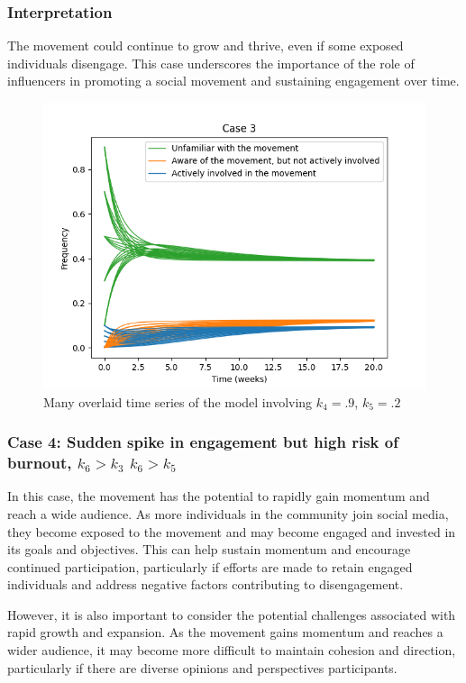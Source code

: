 \documentclass{article}
\begin{document}
    \subsubsection*{Interpretation}The movement could continue to grow and thrive, even if some exposed individuals disengage. This case underscores the importance of the role of influencers in promoting a social movement and sustaining engagement over time. 

    \begin{figure}[H]

        \centering
        \includegraphics[width=\textwidth]{simulation/plots/case3.png}   
        \caption{Many overlaid time series of the model involving \mbox{$k_4=.9$}, \mbox{$k_5=.2$}}
        \label{fig:case3}
    \end{figure}


    \subsubsection*{Case 4: Sudden spike in engagement but high risk of burnout, $k_6 > k_3$  $k_6 > k_5$}
   In this case, the movement has the potential to rapidly gain momentum and reach a wide audience. As more individuals in the community join social media, they become exposed to the movement and may become engaged and invested in its goals and objectives. This can help sustain momentum and encourage continued participation, particularly if efforts are made to retain engaged individuals and address negative factors contributing to disengagement. 
   
   However, it is also important to consider the potential challenges associated with rapid growth and expansion. As the movement gains momentum and reaches a wider audience, it may become more difficult to maintain cohesion and direction, particularly if there are diverse opinions and perspectives  participants.
\end{document}
